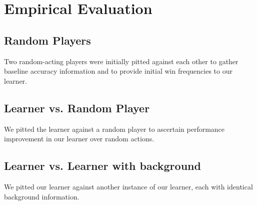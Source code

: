 \documentclass[12pt,pdftex,twocolumn]{article}
\begin{document}

\section{Empirical Evaluation}

\subsection{Random Players}
Two random-acting players were initially pitted against each other to gather baseline accuracy information and to provide initial win frequencies to our learner.

\subsection{Learner vs. Random Player}
We pitted the learner against a random player to ascertain performance improvement in our learner over random actions.

\subsection{Learner vs. Learner with background}
We pitted our learner against another instance of our learner, each with identical background information.
\end{document}
